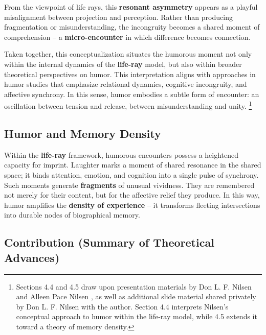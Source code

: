 From the viewpoint of life rays, this \textbf{resonant asymmetry} appears as a
playful misalignment between projection and perception. Rather than producing
fragmentation or misunderstanding, the incongruity becomes a shared moment of
comprehension -- a \textbf{micro-encounter} in which difference becomes connection.

Taken together, this conceptualization situates the humorous moment not only within
the internal dynamics of the \textbf{life-ray} model, but also within broader theoretical
perspectives on humor. This interpretation aligns with approaches in humor studies
that emphasize relational dynamics, cognitive incongruity, and affective synchrony.
In this sense, humor embodies a subtle form of encounter: an oscillation between
tension and release,  between misunderstanding and unity.
\footnote{Sections 4.4 and 4.5 draw upon presentation materials by Don L. F. Nilsen and Alleen Pace Nilsen \cite{nilsen2023philosophy,nilsen2024humor_theories,nilsen2025humor_computers},
as well as additional slide material shared privately by Don L. F. Nilsen with the author.
Section 4.4 interprets Nilsen’s conceptual approach to humor within the life-ray model,
while 4.5 extends it toward a theory of memory density.}


\subsection{Humor and Memory Density}

Within the \textbf{life-ray} framework, humorous encounters possess a heightened capacity for imprint.
Laughter marks a moment of shared resonance in the shared space;
it binds attention, emotion, and cognition into a single pulse of synchrony.
Such moments generate \textbf{fragments} of unusual vividness.
They are remembered not merely for their content, but for the affective relief they produce.
In this way, humor amplifies the \textbf{density of experience} --
it transforms fleeting intersections into durable nodes of biographical memory.

\subsection{Contribution (Summary of Theoretical Advances)}

